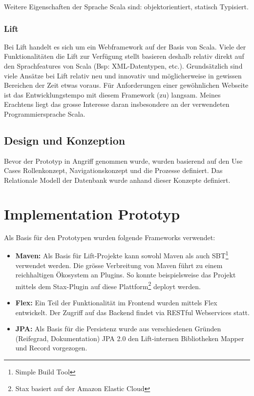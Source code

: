 Weitere Eigenschaften der Sprache Scala sind: objektorientiert, statisch Typisiert.
\subsubsection{Lift}
Bei Lift handelt es sich um ein Webframework auf der Basis von Scala. Viele der Funktionalit\"aten die Lift zur Verf\"ugung stellt basieren deshalb relativ direkt auf den Sprachfeatures von Scala (Bsp: XML-Datentypen, etc.). Grunds\"atzlich sind viele Ans\"atze bei Lift relativ neu und innovativ und m\"oglicherweise in gewissen Bereichen der Zeit etwas voraus. F\"ur Anforderungen einer gew\"ohnlichen Webseite ist das Entwicklungstempo mit diesem Framework (zu) langsam. Meines Erachtens liegt das grosse Interesse daran insbesondere an der verwendeten Programmiersprache Scala. 

\subsection{Design und Konzeption}
Bevor der Prototyp in Angriff genommen wurde, wurden basierend auf den Use Cases Rollenkonzept, Navigationskonzept und die Prozesse definiert. Das Relationale Modell der Datenbank wurde anhand dieser Konzepte definiert. 

\section{Implementation Prototyp}
Als Basis f\"ur den Prototypen wurden folgende Frameworks verwendet:
\begin{itemize}
\item \textbf{Maven: } Als Basis f\"ur Lift-Projekte kann sowohl Maven als auch SBT\footnote{Simple Build Tool} verwendet werden. Die gr\"osse Verbreitung von Maven f\"uhrt zu einem reichhaltigen \"Okosystem an Plugins. So konnte beispielsweise das Projekt mittels dem Stax-Plugin auf diese Plattform\footnote{Stax basiert auf der Amazon Elastic Cloud} deployt werden.
\item \textbf{Flex: }Ein Teil der Funktionalit\"at im Frontend wurden mittels Flex entwickelt. Der Zugriff auf das Backend findet via RESTful Webservices statt.
\item \textbf{JPA: } Als Basis f\"ur die Persistenz wurde aus verschiedenen Gr\"unden (Reifegrad, Dokumentation) JPA 2.0 den Lift-internen Bibliotheken Mapper und Record vorgezogen.
\end{itemize}

